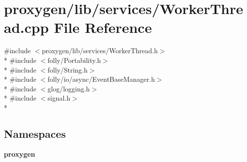 \section{proxygen/lib/services/\+Worker\+Thread.cpp File Reference}
\label{WorkerThread_8cpp}
{\ttfamily \#include $<$proxygen/lib/services/\+Worker\+Thread.\+h$>$}\\*
{\ttfamily \#include $<$folly/\+Portability.\+h$>$}\\*
{\ttfamily \#include $<$folly/\+String.\+h$>$}\\*
{\ttfamily \#include $<$folly/io/async/\+Event\+Base\+Manager.\+h$>$}\\*
{\ttfamily \#include $<$glog/logging.\+h$>$}\\*
{\ttfamily \#include $<$signal.\+h$>$}\\*
\subsection*{Namespaces}
\begin{DoxyCompactItemize}
\item 
 {\bf proxygen}
\end{DoxyCompactItemize}
